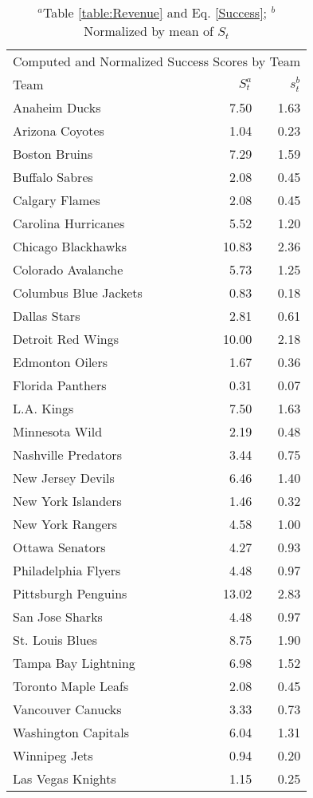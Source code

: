 \documentclass[11pt]{report}            %
\begin{document}
\begin{table}[htp]
\centering
\begin{tabular}{lrr}
\hline
\multicolumn{3}{c}{Computed and Normalized Success Scores by Team} \\
Team & $S_t^a$ & $s_t^b$ \\ 
\hline
Anaheim Ducks & 7.50 & 1.63 \\ 
Arizona Coyotes & 1.04 & 0.23 \\ 
Boston Bruins & 7.29 & 1.59 \\ 
Buffalo Sabres & 2.08 & 0.45 \\ 
Calgary Flames & 2.08 & 0.45 \\ 
Carolina Hurricanes & 5.52 & 1.20 \\ 
Chicago Blackhawks & 10.83 & 2.36 \\ 
Colorado Avalanche & 5.73 & 1.25 \\ 
Columbus Blue Jackets & 0.83 & 0.18 \\ 
Dallas Stars & 2.81 & 0.61 \\ 
Detroit Red Wings & 10.00 & 2.18 \\ 
Edmonton Oilers & 1.67 & 0.36 \\ 
Florida Panthers & 0.31 & 0.07 \\ 
L.A. Kings & 7.50 & 1.63 \\ 
Minnesota Wild & 2.19 & 0.48 \\ 
Nashville Predators & 3.44 & 0.75 \\ 
New Jersey Devils & 6.46 & 1.40 \\ 
New York Islanders & 1.46 & 0.32 \\ 
New York Rangers & 4.58 & 1.00 \\ 
Ottawa Senators & 4.27 & 0.93 \\ 
Philadelphia Flyers & 4.48 & 0.97 \\ 
Pittsburgh Penguins & 13.02 & 2.83 \\ 
San Jose Sharks & 4.48 & 0.97 \\ 
St. Louis Blues & 8.75 & 1.90 \\ 
Tampa Bay Lightning & 6.98 & 1.52 \\ 
Toronto Maple Leafs & 2.08 & 0.45 \\ 
Vancouver Canucks & 3.33 & 0.73 \\ 
Washington Capitals & 6.04 & 1.31 \\ 
Winnipeg Jets & 0.94 & 0.20 \\ 
Las Vegas Knights & 1.15 & 0.25 \\ 
\hline
\end{tabular}
\caption{$^a$Table \ref{table:Revenue} and Eq. \ref{Success}; $^b$Normalized by mean of $S_t$}
\label{table:St}
\end{table}
\end{document}
